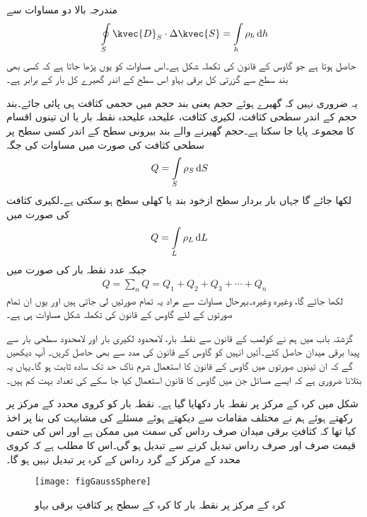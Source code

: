 مندرجہ بالا دو مساوات سے
\begin{align}\label{مساوات_گاوس_کے_قانون_کی_تکملہ_شکل}
\oint\limits_{S} \kvec{D}_S \cdot \Delta \kvec{S}=\int\limits_{h} \rho_h \dif h
\end{align}
حاصل ہوتا ہے جو گاوس کے قانون کی تکملہ شکل ہے۔اس مساوات کو یوں پڑھا جاتا ہے کہ کسی بھی بند سطح سے گزرتی کل برقی بہاو اس سطح کے اندر گھیرے کل بار کے برابر  ہے۔

یہ ضروری نہیں کہ گھیرے ہوئے حجم یعنی بند حجم میں حجمی کثافت ہی پائی جائے۔بند حجم کے اندر  سطحی کثافت، لکیری کثافت، علیحدہ علیحدہ نقطہ بار یا ان تینوں اقسام کا مجموعہ پایا جا سکتا ہے۔حجم گھیرنے والے بند بیرونی سطح کے اندر کسی سطح پر  سطحی کثافت کی صورت میں مساوات  کی جگہ
\begin{align}
Q&=\int\limits_{S} \rho_S \dif S
\end{align}
لکھا جائے گا جہاں بار بردار سطح ازخود بند یا کھلی سطح ہو سکتی ہے۔لکیری کثافت کی صورت میں
\begin{align}
Q&=\int\limits_{L} \rho_L \dif L
\end{align}
جبکہ   عدد نقطہ بار کی صورت میں
\begin{align}
Q=\sum_n Q= Q_1+Q_2+Q_3+\cdots+Q_n
\end{align}
لکھا جائے گا، وغیرہ وغیرہ۔بہرحال مساوات  سے مراد یہ تمام صورتیں لی جاتی ہیں اور یوں ان تمام صورتوں کے لئے گاوس کے  قانون کی تکملہ شکل مساوات  ہی ہے۔


گزشتہ باب میں ہم نے کولمب کے قانون سے نقطہ بار، لامحدود  لکیری بار اور لامحدود سطحی بار  سے پیدا برقی میدان حاصل کئے۔آئیں انہیں کو  گاوس کے قانون کی مدد سے بھی حاصل کریں۔ آپ دیکھیں گے کہ ان تینوں صورتوں میں گاوس کے قانون کا استعمال شرم ناک حد تک سادہ ثابت ہو گا۔یہاں یہ بتلانا ضروری ہے کہ ایسے  مسائل جن میں گاوس کا قانون استعمال کیا جا سکے کی تعداد  بہت کم ہیں۔

شکل  میں کرہ کے مرکز پر نقطہ بار دکھایا گیا ہے۔ نقطہ بار کو کروی محدد کے مرکز پر رکھتے ہوئے ہم  نے مختلف مقامات سے دیکھتے ہوئے مسئلے کی مشابہت کی بنا پر اخذ کیا تھا کہ کثافتِ برقی میدان صرف رداس کی سمت میں ممکن ہے اور اس  کی حتمی قیمت صرف اور صرف رداس  تبدیل کرنے سے تبدیل ہو گی۔اس کا مطلب ہے کہ کروی محدد کے مرکز کے گرد رداس  کے کرہ  پر  تبدیل نہیں ہو گا۔
\begin{figure}
\centering
\texttt{[image: figGaussSphere]}
\caption{کرہ کے مرکز پر نقطہ بار کا کرہ کے سطح پر کثافتِ برقی بہاو}
\label{شکل_گاوس_کرہ_کی_سطح_پر_مرکز_کے_نقطہ_بار_کا_میدان}
\end{figure}

